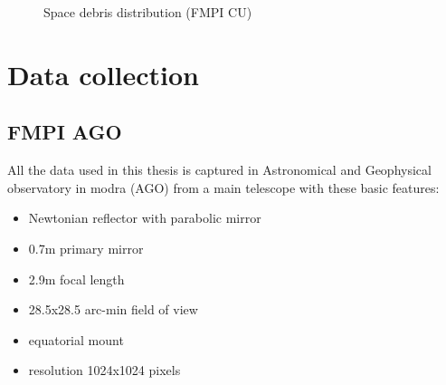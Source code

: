 \documentclass[12pt, a4paper, oneside]{book}
\begin{document}
\begin{figure}[h]
    \centering
    \qquad
    \caption{Space debris distribution (FMPI CU)}%
    \label{fig:example}%
\end{figure}

\section{Data collection}

\subsection{FMPI AGO}
All the data used in this thesis is captured in Astronomical and Geophysical observatory in modra (AGO) from a main telescope with these basic features:
\begin{itemize}
    \item{Newtonian reflector with parabolic mirror}
    \item{0.7m primary mirror}
    \item{2.9m focal length}
    \item{28.5x28.5 arc-min field of view}
    \item{equatorial mount}
    \item{resolution 1024x1024 pixels}
\end{itemize}
\end{document}
